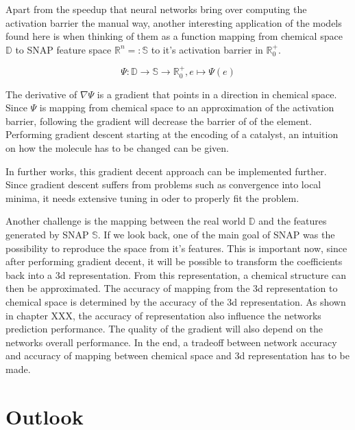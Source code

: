 Apart from the speedup that neural networks bring over computing the activation barrier the manual way,
another interesting application of the models found here is when thinking of them as a function mapping from chemical space $\mathbb{D}$ to SNAP feature space 
$\mathbb{R}^n =: \mathbb{S}$ to it's activation barrier in $\mathbb{R}^+_0$.

$$ \Psi : \mathbb{D} \to \mathbb{S} \to \mathbb{R}^+_0, e \mapsto \Psi(e) $$

The derivative of $\nabla \Psi$ is a gradient that points in  a direction in chemical space.
Since $\Psi$ is mapping from chemical space to an approximation of the activation barrier,
following the gradient will decrease the barrier of of the element.
Performing gradient descent starting at the encoding of a catalyst, an intuition on how the 
molecule has to be changed can be given.

In further works, this gradient decent approach can be implemented further.
Since gradient descent suffers from problems such as convergence into local minima, 
it needs extensive tuning in oder to properly fit the problem.

Another challenge is the mapping between the real world $\mathbb{D}$ and the features generated by SNAP $\mathbb{S}$.
If we look back, one of the main goal of SNAP was the possibility to reproduce the space from it's features.
This is important now, since after performing gradient decent, it will be possible to transform the coefficients
back into a 3d representation.
From this representation, a chemical structure can then be approximated.
The accuracy of mapping from the 3d representation to chemical space is determined by the accuracy of the 3d representation.
As shown in chapter XXX, the accuracy of representation also influence the networks prediction performance.
The quality of the gradient will also depend on the networks overall performance.
In the end, a tradeoff between network accuracy and accuracy of mapping between chemical space and 3d representation has to be made.

\section{Outlook}

